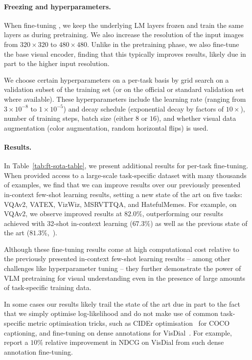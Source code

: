 \paragraph{Freezing and hyperparameters.}
When fine-tuning \largem{}, we keep the underlying LM layers frozen and train the same \method{} layers as during pretraining.
We also increase the resolution of the input images from $320\times320$ to $480\times480$.
Unlike in the pretraining phase, we also fine-tune the base visual encoder, finding that this typically improves results, likely due in part to the higher input resolution.

We choose certain hyperparameters on a per-task basis by grid search on a validation subset of the training set (or on the official or standard validation set where available).
These hyperparameters include
the learning rate (ranging from $3\times10^{-8}$ to $1\times10^{-5}$)
and decay schedule (exponential decay by factors of $10\times$),
number of training steps,
batch size (either $8$ or $16$),
and
whether visual data augmentation (color augmentation, random horizontal flips) is used.


\paragraph{Results.}
In Table~\ref{tab:ft-sota-table}, we present additional results for per-task \largem{} fine-tuning.
When provided access to a large-scale task-specific dataset with many thousands of examples, we find that we can improve results over our previously presented in-context few-shot learning results,
setting a new state of the art on five tasks: VQAv2, VATEX, VizWiz, MSRVTTQA, and HatefulMemes.
For example, on VQAv2, we observe improved results at $82.0\%$, outperforming our results achieved with 32-shot in-context learning ($67.3\%$) as well as the previous state of the art ($81.3\%$,~\citet{yan2021achieving}).

Although these fine-tuning results come at high computational cost relative to the previously presented in-context few-shot learning results -- among other challenges like hyperparameter tuning -- they further demonstrate the power of VLM pretraining for visual understanding even in the presence of large amounts of task-specific training data.

In some cases our results likely trail the state of the art due in part to the fact that we simply optimise log-likelihood and do not make use of common task-specific metric optimisation tricks, such as
CIDEr optimisation~\citep{selfcritical,spider} for COCO captioning, and
fine-tuning on dense annotations for VisDial~\citep{murahari2020large}.
For example,~\citet{murahari2020large} report a $10\%$ relative improvement in NDCG on VisDial from such dense annotation fine-tuning.


